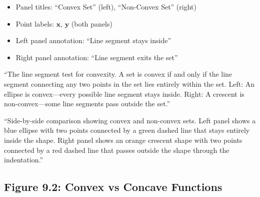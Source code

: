 \documentclass[12pt]{article}
\begin{document}
\begin{description}[style=nextline, leftmargin=0pt]
    \item[Required Labels]
    \begin{itemize}
        \item Panel titles: ``Convex Set'' (left), ``Non-Convex Set'' (right)
        \item Point labels: $\mathbf{x}$, $\mathbf{y}$ (both panels)
        \item Left panel annotation: ``Line segment stays inside''
        \item Right panel annotation: ``Line segment exits the set''
    \end{itemize}

    \item[Caption Text]
    ``The line segment test for convexity. A set is convex if and only if the line segment connecting any two points in the set lies entirely within the set. Left: An ellipse is convex---every possible line segment stays inside. Right: A crescent is non-convex---some line segments pass outside the set.''

    \item[Alt-Text for Accessibility]
    ``Side-by-side comparison showing convex and non-convex sets. Left panel shows a blue ellipse with two points connected by a green dashed line that stays entirely inside the shape. Right panel shows an orange crescent shape with two points connected by a red dashed line that passes outside the shape through the indentation.''
\end{description}

\newpage

\subsection{Figure 9.2: Convex vs Concave Functions}
\end{document}
